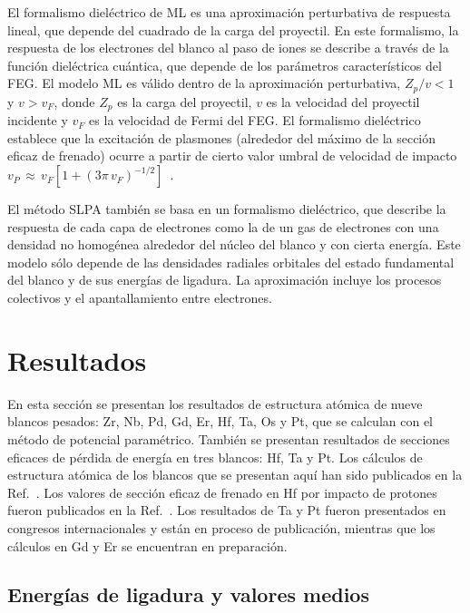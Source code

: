 El formalismo dieléctrico de ML es una aproximación perturbativa de 
respuesta lineal, que depende del cuadrado de la carga del proyectil. En 
este formalismo, la respuesta de los electrones del blanco al paso de 
iones se describe a través de la función dieléctrica cuántica, que 
depende de los parámetros característicos del FEG. El modelo ML es 
válido dentro de la aproximación perturbativa, $Z_p/v<1$ y $v>v_F$, 
donde $Z_p$ es la carga del proyectil, $v$ es la velocidad del proyectil
incidente y $v_F$ es la velocidad de Fermi del FEG. El formalismo 
dieléctrico establece que la excitación de plasmones (alrededor del 
máximo de la sección eficaz de frenado) ocurre a partir de cierto valor 
umbral de velocidad de impacto 
$v_P\,\approx\,v_F[1+(3\pi\,v_F)^{-1/2}]$~\cite{suppression}. 

El método SLPA también se basa en un formalismo dieléctrico, que 
describe la respuesta de cada capa de electrones como la de un gas 
de electrones con una densidad no homogénea alrededor del núcleo del 
blanco y con cierta energía. Este modelo sólo depende de las densidades 
radiales orbitales del estado fundamental del blanco y de sus energías 
de ligadura. La aproximación incluye los procesos colectivos y el 
apantallamiento entre electrones. 

\section{Resultados}
\label{sec:results-heavy}

En esta sección se presentan los resultados de estructura atómica de 
nueve blancos pesados: Zr, Nb, Pd, Gd, Er, Hf, Ta, Os y Pt, que se 
calculan con el método de potencial paramétrico. También se presentan 
resultados de secciones eficaces de pérdida de energía en tres blancos: 
Hf, Ta y Pt. Los cálculos de estructura atómica de los blancos que se 
presentan aquí han sido publicados en la Ref.~\cite{Mendez:19relat}. Los 
valores de sección eficaz de frenado en Hf por impacto de protones 
fueron publicados en la Ref.~\cite{Montanari:20}. Los resultados de Ta y 
Pt fueron presentados en congresos internacionales y están en proceso de 
publicación, mientras que los cálculos en Gd y Er se encuentran en 
preparación. 

\subsection{Energías de ligadura y valores medios}
\label{subsec:results-target}


